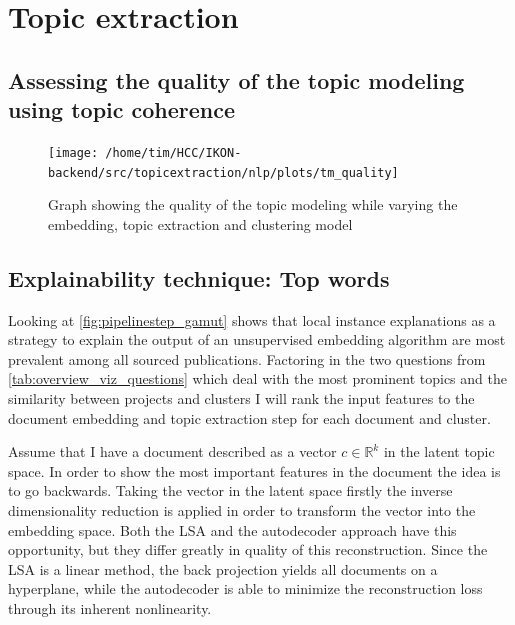 \section{Topic extraction}

\subsection{Assessing the quality of the topic modeling using topic coherence}

\begin{figure}[t]
	\centering
	\texttt{[image: /home/tim/HCC/IKON-backend/src/topicextraction/nlp/plots/tm\_quality]}
	\caption{\label{pic:tm_quality} Graph showing the quality of the topic modeling while varying the embedding, topic extraction and clustering model}
\end{figure}

\subsection{Explainability technique: Top words}

Looking at \autoref{fig:pipelinestep_gamut} shows that local instance explanations as a strategy to explain the output of an unsupervised embedding algorithm are most prevalent among all sourced publications. Factoring in the two questions from \autoref{tab:overview_viz_questions} which deal with the most prominent topics and the similarity between projects and clusters I will rank the input features to the document embedding and topic extraction step for each document and cluster. 

Assume that I have a document described as a vector $c \in \mathbb{R}^k$ in the latent topic space. In order to show the most important features in the document the idea is to go backwards. Taking the vector in the latent space firstly the inverse dimensionality reduction is applied in order to transform the vector into the embedding space. Both the LSA and the autodecoder approach have this opportunity, but they differ greatly in quality of this reconstruction. Since the LSA is a linear method, the back projection yields all documents on a hyperplane, while the autodecoder is able to minimize the reconstruction loss through its inherent nonlinearity. 

